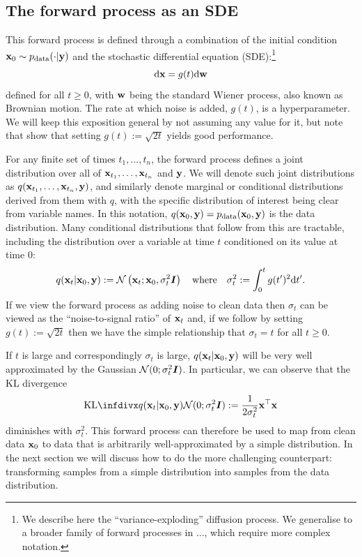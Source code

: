 \subsection{The forward process as an SDE} \label{sec:diffusion-forward-sde}
This forward process is defined through a combination of the initial condition ${\mathbf{x}}_0 \sim p_{\rm{data}}(\cdot|{\mathbf{y}})$ and the stochastic differential equation (SDE):\footnote{We describe here the ``variance-exploding'' diffusion process. We generalise to a broader family of forward processes in ..., which require more complex notation.}
\begin{equation} \label{eq:forward-diffusion}
    \mathrm{d}{\mathbf{x}} = g(t) \mathrm{d}{\mathbf{w}}
\end{equation}
defined for all $t \geq 0$, with ${\mathbf{w}}$ being the standard Wiener process, also known as Brownian motion. The rate at which noise is added, $g(t)$, is a hyperparameter. We will keep this exposition general by not assuming any value for it, but note that \citet{karras2022elucidating} show that setting $g(t) := \sqrt{2t}$ yields good performance.

For any finite set of times $t_1,\ldots,t_n$, the forward process defines a joint distribution over all of ${\mathbf{x}}_{t_1},\ldots,{\mathbf{x}}_{t_n}$ and ${\mathbf{y}}$. We will denote such joint distributions as $q({\mathbf{x}}_{t_1},\ldots,{\mathbf{x}}_{t_n}, {\mathbf{y}})$, and similarly denote marginal or conditional distributions derived from them with $q$, with the specific distribution of interest being clear from variable names. In this notation, $q({\mathbf{x}}_0,{\mathbf{y}}) = p_{\rm{data}}({\mathbf{x}}_0,{\mathbf{y}})$ is the data distribution. Many conditional distributions that follow from this are tractable, including the distribution over a variable at time $t$ conditioned on its value at time $0$:
\begin{equation}
    q({\mathbf{x}}_t|{\mathbf{x}}_0,{\mathbf{y}}) := {\mathcal{N}} \left( {\mathbf{x}}_t; {\mathbf{x}}_0, \sigma_t^2 {\bm{I}} \right) \quad \text{where} \quad \sigma_t^2 := \int_0^t g(t')^2 \mathrm{d}t'.
\end{equation}
If we view the forward process as adding noise to clean data then $\sigma_t$ can be viewed as the ``noise-to-signal ratio'' of ${\mathbf{x}}_t$ and, if we follow \citet{karras2022elucidating} by setting $g(t) := \sqrt{2t}$ then we have the simple relationship that $\sigma_t = t$ for all $t\geq0$.

If $t$ is large and correspondingly $\sigma_t$ is large, $q({\mathbf{x}}_t|{\mathbf{x}}_0,{\mathbf{y}})$ will be very well approximated by the Gaussian ${\mathcal{N}}(0; \sigma_t^2{\bm{I}})$. In particular, we can observe that the KL divergence
\begin{equation}
    \kl{q(\rvx_t|\rvx_0,\rvy)}{\gN(0; \sigma_t^2\mI)} :=\frac{1}{2\sigma_t^2} \rvx^\top \rvx
\end{equation}
diminishes with $\sigma_t^2$. This forward process can therefore be used to map from clean data ${\mathbf{x}}_0$ to data that is arbitrarily well-approximated by a simple distribution. In the next section we will discuss how to do the more challenging counterpart: transforming samples from a simple distribution into samples from the data distribution.

